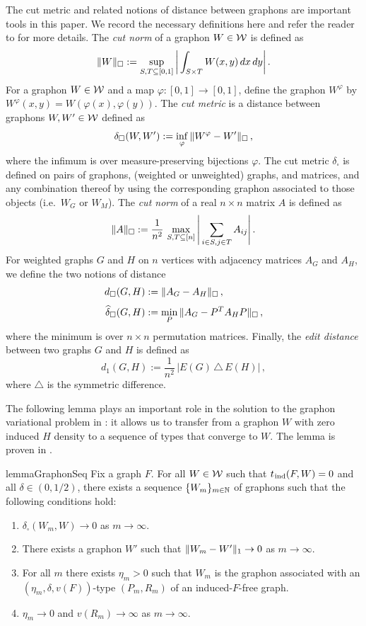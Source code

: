 The cut metric and related notions of distance between graphons are important tools in this paper. We record the necessary definitions here and refer the reader to \cite{lovasz2012large} for more details. The \emph{cut norm} of a graphon $W\in{\mathcal W}$ is defined as
$$\lVert W\rVert_\square:=\sup_{S,T\subseteq[0,1]}\bigg|\int_{S\times T}W(x,y)\,dx\,dy\bigg|\,.$$
For a graphon $W\in{\mathcal W}$ and a map $\varphi:[0,1]\to[0,1]$, define the graphon $W^\varphi$ by $W^\varphi(x,y)=W(\varphi(x),\varphi(y))$. The \emph{cut metric} is a distance between graphons $W,W'\in{\mathcal W}$ defined as
$$\delta_\square(W,W'):=\inf_\varphi\,\lVert W^\varphi-W'\rVert_\square\,,$$
where the infimum is over measure-preserving bijections $\varphi$. The cut metric $\delta_\square$ is defined on pairs of graphons, (weighted or unweighted) graphs, and matrices, and any combination thereof by using the corresponding graphon associated to those objects (i.e.\ $W_G$ or $W_M$). The \emph{cut norm} of a real $n\times n$ matrix $A$ is defined as
$$\lVert A\rVert_\square:=\frac{1}{n^2}\,\max_{S,T\subseteq[n]}\Bigg|\sum_{i\in S,j\in T}A_{ij}\Bigg|\,.$$
For weighted graphs $G$ and $H$ on $n$ vertices with adjacency matrices $A_G$ and $A_H$, we define the two notions of distance
\begin{align*}
d_\square(G,H) &:= \lVert A_G-A_H\rVert_\square \,, \\[3pt]
\widehat{\delta}_\square(G,H) &:= \min_P\,\lVert A_G-P^TA_HP\rVert_\square \,,
\end{align*}
where the minimum is over $n\times n$ permutation matrices. Finally, the \emph{edit distance} between two graphs $G$ and $H$ is defined as
$$d_1(G,H):=\frac{1}{n^2}\,|E(G)\,\triangle\,E(H)|\,,$$
where $\triangle$ is the symmetric difference.

The following lemma plays an important role in the solution to the graphon variational problem in : it allows us to transfer from a graphon $W$ with zero induced $H$ density to a sequence of types that converge to $W$. The lemma is proven in .

\begin{restatable}{lemma}{GraphonSeq}\label{lemma:UFHatGraphonSeq}
Fix a graph $F$. For all $W\in{\mathcal W}$ such that $t_{{\hspace{0.2mm}\mathrm{ind}}}(F,W)=0$ and all $\delta\in(0,1/2)$, there exists a sequence $\{W_m\}_{m\in{\mathbb N}}$ of graphons such that the following conditions hold:
\begin{enumerate}[
  label=\textit{(\roman*)},
  ref=(\textit{\roman*}),
  topsep=5pt
]
	\item $\delta_\square(W_m,W)\to0$ as $m\to\infty$.
    \item There exists a graphon $W'$ such that $\lVert W_m-W'\rVert_1\to0$ as $m\to\infty$.
	\item For all $m$ there exists $\eta_m>0$ such that $W_m$ is the graphon associated with an $(\eta_m,\delta,v(F))$-type $(P_m,R_m)$ of an induced-$F$-free graph.
	\item $\eta_m\to0$ and $v(R_m)\to\infty$ as $m\to\infty$.
\end{enumerate}
\end{restatable}
